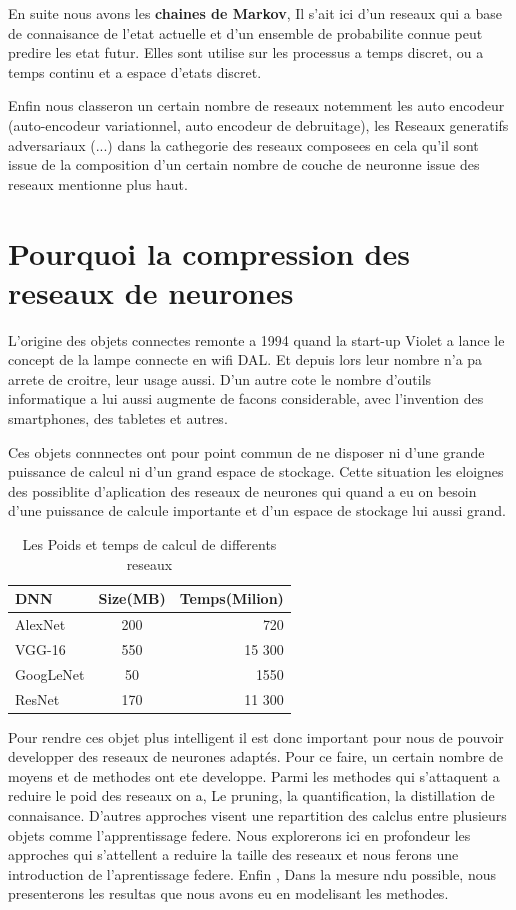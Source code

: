 \documentclass[twoside,twocolumn]{article}
\begin{document}
En suite nous avons les \textbf{chaines de Markov}, Il s'ait ici d'un reseaux qui a base de connaisance de l'etat actuelle et d'un ensemble de probabilite connue peut predire les etat futur. Elles sont utilise sur les 
processus a temps discret, ou a temps continu et a espace d'etats discret.

Enfin nous classeron un certain nombre de reseaux notemment les auto encodeur (auto-encodeur variationnel, auto encodeur de debruitage), les Reseaux generatifs adversariaux (...) dans la cathegorie des reseaux composees
en cela qu'il sont issue de la composition d'un certain nombre de couche de neuronne issue des reseaux mentionne plus haut.

\section{Pourquoi la compression des reseaux de neurones}%
L'origine des objets connectes remonte a 1994 quand la start-up Violet a lance le concept de la lampe connecte en wifi DAL. Et depuis lors leur nombre n'a pa arrete de croitre, leur usage aussi. D'un autre cote le nombre d'outils 
informatique a lui aussi augmente de facons considerable, avec l'invention des smartphones, des tabletes et autres.

Ces objets connnectes ont pour point commun de ne disposer ni d'une grande puissance de calcul ni d'un grand espace de stockage. Cette situation les eloignes des possiblite d'aplication des reseaux de neurones qui quand a eu on besoin
d'une puissance de calcule importante et d'un espace de stockage lui aussi grand.

\begin{table}[!h]  
\begin{tabular}{|l|c|r|}
    \hline
    DNN & Size(MB) & Temps(Milion) \\
    \hline
    AlexNet & 200 & 720 \\
    VGG-16 & 550 & 15 300 \\
    GoogLeNet & 50 & 1550 \\
  ResNet & 170 & 11 300 \\
  \hline
\end{tabular}
\caption{Les Poids et temps de calcul de differents reseaux}
\end{table}

Pour rendre ces objet plus intelligent il est donc important pour nous de pouvoir developper des reseaux de neurones adaptés. Pour ce faire, 
un certain nombre de moyens et de methodes ont ete developpe. Parmi les methodes qui s'attaquent a reduire le poid des reseaux on a, Le pruning, la quantification, la distillation de connaisance.
D'autres approches visent une repartition des calclus entre plusieurs objets comme l'apprentissage federe. Nous explorerons ici en profondeur les approches qui 
s'attellent a reduire la taille des reseaux et nous ferons une introduction de l'aprentissage federe. Enfin , Dans la mesure ndu possible, nous presenterons les resultas que nous avons eu en 
modelisant les methodes.
\end{document}
